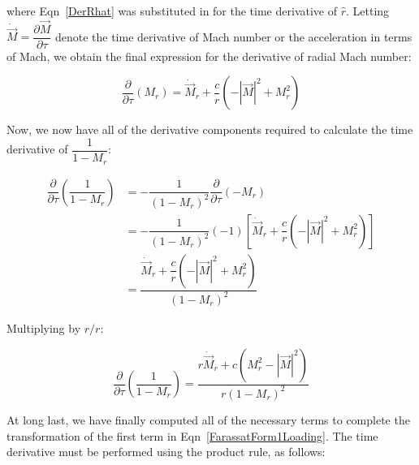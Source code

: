 \documentclass[]{aiaa-tc}%
\begin{document}
\noindent where Eqn~\ref{DerRhat} was substituted in for the time derivative of $\hat{r}$.  Letting $\dot{\vec{M}} = \dfrac{\partial \vec{M}}{\partial \tau}$ denote the time derivative of Mach number or the acceleration in terms of Mach, we obtain the final expression for the derivative of radial Mach number:

\begin{equation} \label{DerMr}
\dfrac{\partial}{\partial\tau} \left( M_r \right)
= \dot{\vec{M}}_r + \dfrac{c}{r}
    \left( -|\vec{M}|^2 + M_r^2 \right)
\end{equation}

Now, we now have all of the derivative components required to calculate the time derivative of $\dfrac{1}{1 - M_r}$:

\begin{align*}
\dfrac{\partial}{\partial\tau} \left( \dfrac{1}{1 - M_r} \right)
&= -\dfrac{1}{(1 - M_r)^2} \dfrac{\partial}{\partial\tau}(-M_r) \\
&= -\dfrac{1}{(1 - M_r)^2}(-1) \left[
    \dot{\vec{M}}_r +\dfrac{c}{r}\left( -|\vec{M}|^2 + M_r^2 \right) \right] \\
&= \dfrac{ \dot{\vec{M}}_r + \dfrac{c}{r} \left( -|\vec{M}|^2 + M_r^2 \right) }
    {(1 - M_r)^2}
\end{align*}

\noindent Multiplying by $r/r$:

\begin{equation} \label{DerMrDenom}
\dfrac{\partial}{\partial\tau} \left( \dfrac{1}{1 - M_r} \right)
= \dfrac{ r\dot{\vec{M}}_r + c \left( M_r^2 - |\vec{M}|^2 \right) }
    {r (1 - M_r)^2}
\end{equation}

At long last, we have finally computed all of the necessary terms to complete the transformation of the first term in Eqn~\ref{FarassatForm1Loading}.  The time derivative must be performed using the product rule, as follows:
\end{document}
